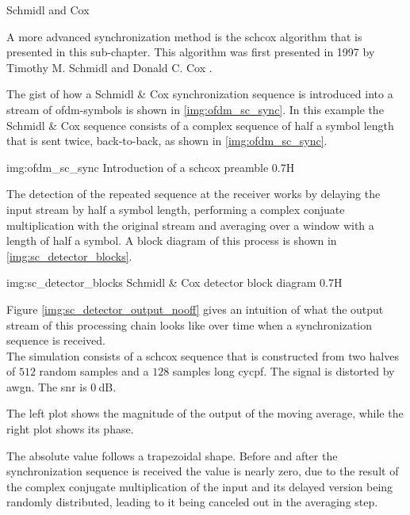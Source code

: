 \begin{subchapter}{Schmidl and Cox}
  \label{chap:intr_scsync}

  A more advanced synchronization method is
  the \acrlong{schcox} algorithm that is presented
  in this sub-chapter.
  This algorithm was first presented in 1997 by
  Timothy M. Schmidl and Donald C. Cox \cite{schmidlcox}.

  The gist of how a Schmidl \& Cox synchronization sequence
  is introduced into a stream of \gls{ofdm}-symbols is
  shown in \autoref{img:ofdm_sc_sync}.
  In this example the Schmidl \& Cox sequence
  consists of a complex sequence
  of half a symbol length that is sent twice, back-to-back,
  as shown in \autoref{img:ofdm_sc_sync}.

               {img:ofdm_sc_sync}
               {Introduction of a \acrlong{schcox} preamble}
               {0.7}{H}

  The detection of the repeated sequence at the receiver works by delaying
  the input stream by half a symbol length, performing a complex conjuate
  multiplication with the original stream and averaging over a window with
  a length of half a symbol.
  A block diagram of this process is shown in \autoref{img:sc_detector_blocks}.

               {img:sc_detector_blocks}
               {Schmidl \& Cox detector block diagram}
               {0.7}{H}

  Figure \ref{img:sc_detector_output_nooff} gives an intuition
  of what the output stream of this processing chain looks like
  over time when a synchronization sequence is received. \\

  The simulation consists of a \gls{schcox} sequence
  that is constructed from two halves of $512$ random samples
  and a $128$ samples long \acrlong{cycpf}.
  The signal is distorted by \gls{awgn}.
  The \gls{snr} is $\SI{0}{\deci\bel}$.

  The left plot shows the magnitude of the output of
  the moving average, while the right plot shows its phase.

  The absolute value follows a trapezoidal shape.
  Before and after the synchronization sequence is received
  the value is nearly zero, due to the result of the complex
  conjugate multiplication of the input and its delayed version
  being randomly distributed, leading to it being canceled out
  in the averaging step.


\end{subchapter}
